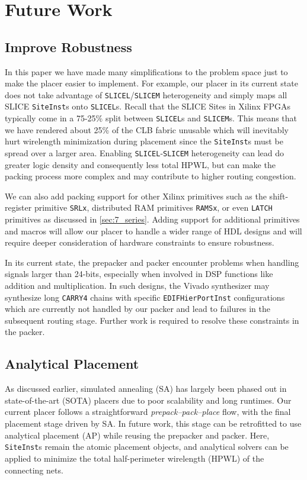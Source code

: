 \section{Future Work}


\subsection{Improve Robustness}
In this paper we have made many simplifications to the problem space just to make the placer easier to implement.
For example, our placer in its current state does not take advantage of \texttt{SLICEL}/\texttt{SLICEM} heterogeneity and simply maps all SLICE \texttt{SiteInst}s onto \texttt{SLICEL}s. 
Recall that the SLICE Sites in Xilinx FPGAs typically come in a 75-25\% split between \texttt{SLICEL}s and \texttt{SLICEM}s. 
This means that we have rendered about 25\% of the CLB fabric unusable which will inevitably hurt wirelength minimization during placement since the \texttt{SiteInst}s must be spread over a larger area. 
Enabling \texttt{SLICEL}-\texttt{SLICEM} heterogeneity can lead do greater logic density and consequently less total HPWL, but can make the packing process more complex and may contribute to higher routing congestion.

We can also add packing support for other Xilinx primitives such as the shift-register primitive \texttt{SRLx}, distributed RAM primitives \texttt{RAMSx}, or even \texttt{LATCH} primitives as discussed in \ref{sec:7_series}.
Adding support for additional primitives and macros will allow our placer to handle a wider range of HDL designs and will require deeper consideration of hardware constraints to ensure robustness.

In its current state, the prepacker and packer encounter problems when handling signals larger than 24-bits, especially when involved in DSP functions like addition and multiplication. 
In such designs, the Vivado synthesizer may synthesize long \texttt{CARRY4} chains with specific \texttt{EDIFHierPortInst} configurations which are currently not handled by our packer and lead to failures in the subsequent routing stage.
Further work is required to resolve these constraints in the packer.

\subsection{Analytical Placement}
As discussed earlier, simulated annealing (SA) has largely been phased out in state-of-the-art (SOTA) placers due to poor scalability and long runtimes. 
Our current placer follows a straightforward \emph{prepack–pack–place} flow, with the final placement stage driven by SA. 
In future work, this stage can be retrofitted to use analytical placement (AP) while reusing the prepacker and packer. 
Here, \texttt{SiteInst}s remain the atomic placement objects, and analytical solvers can be applied to minimize the total half-perimeter wirelength (HPWL) of the connecting nets.

